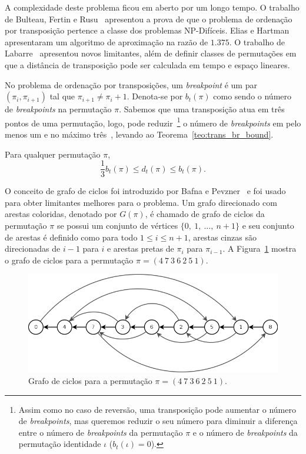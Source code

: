 A complexidade deste problema ficou em aberto por um longo tempo. O
trabalho de Bulteau, Fertin e Rusu~\cite{BulteauFertinRusu*2010}
apresentou a prova de que o problema de ordenação por transposição
pertence a classe dos problemas NP-Difíceis. Elias e
Hartman~\cite{EliasHartman*2006} apresentaram um algoritmo de
aproximação na razão de $1.375$. O trabalho de
Labarre~\cite{Labarre*2006} apresentou novos limitantes, além de definir
classes de permutações em que a distância de transposição pode ser
calculada em tempo e espaço lineares.

No problema de ordenação por transposições, um \textit{breakpoint} é um
par $(\pi_{i}, \pi_{i+1})$ tal que $\pi_{i+1} \neq \pi_{i} + 1$.
Denota-se por $b_{t}(\pi)$ como sendo o número de \textit{breakpoints}
na permutação $\pi$. Sabemos que uma transposição atua em três pontos de
uma permutação, logo, pode reduzir~\footnote{Assim como no caso de
reversão, uma transposição pode aumentar o número de
\textit{breakpoints}, mas queremos reduzir o seu número para
diminuir a diferença entre o número de \textit{breakpoints} da
permutação $\pi$ e o número de \textit{breakpoints} da permutação
identidade $\iota$ ($b_t(\iota) = 0$).} o número de \textit{breakpoints} 
em pelo menos um e no máximo três~\cite{BafnaPevzner*1998}, levando ao
Teorema~\ref{teo:trans_br_bound}.

\begin{teo}
  \label{teo:trans_br_bound}
  Para qualquer permutação $\pi$, 
  \[
  \frac{1}{3}b_t(\pi) \leq d_t(\pi) \leq b_t(\pi).
  \]
\end{teo}

O conceito de grafo de ciclos foi introduzido por Bafna e
Pevzner~\cite{BafnaPevzner*1998} e foi usado para obter limitantes
melhores para o problema. Um grafo direcionado com arestas coloridas,
denotado por $G(\pi)$, é chamado de grafo de ciclos da permutação $\pi$
se possui um conjunto de vértices $\{0,~1,~\ldots,~n+1\}$ e seu conjunto
de arestas é definido como para todo $1 \leq i \leq n+1$, arestas cinzas
são direcionadas de $i-1$ para $i$ e arestas pretas de $\pi_{i}$ para
$\pi_{i-1}$. A Figura~\ref{fig:trans_cycle_graph} mostra o grafo de
ciclos para a permutação $\pi = (4~7~3~6~2~5~1)$.

\begin{figure}[h]
  \centering 
  \includegraphics[scale=0.6]{images/trans_cycle_graph.png} 
  \caption{Grafo de ciclos para a permutação $\pi = (4~7~3~6~2~5~1)$.}
  \label{fig:trans_cycle_graph}
\end{figure}

